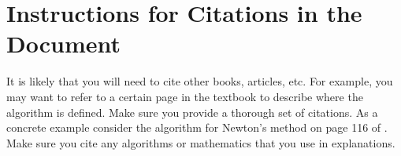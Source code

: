 
\section{\bf Instructions for Citations in the Document}

It is likely that you will need to cite other books, articles, etc. For example,
you may want to refer to a certain page in the textbook to describe where the
algorithm is defined. Make sure you provide a thorough set of citations. As
a concrete example consider the algorithm for Newton's method on page 116 of
\cite{AscherGrief}. Make sure you cite any algorithms or mathematics that you
use in explanations.

\newpage
